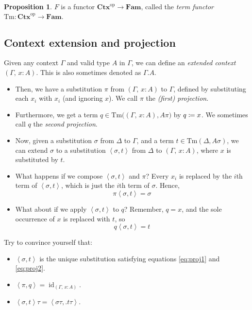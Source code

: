 \documentclass{article}
\theoremstyle{definition}
\newtheorem{proposition}[definition]{Proposition}
\newcommand{\comp}[2]{#2#1}%
\newcommand{\substType}[2]{#2#1}%
\newcommand{\substTerm}[2]{#2#1}%
\newcommand{\extsub}[2]{\ang{#1,#2}}
\newcommand{\C}{\mathbf{Ctx}}
\newcommand{\Fam}{\mathbf{Fam}}
\newcommand{\Tm}{\mathrm{Tm}}
\newcommand{\op}[1]{{#1}^\mathrm{op}}           %
\DeclareMathOperator{\id}{id}				    %
\newcommand{\defeq}{
	\mathrel{\mathrel{\mathop:}\mkern-1.2mu=}}	%
\newcommand{\ang}[1]{\left\langle #1 \right\rangle}
\begin{document}
\begin{proposition}
    $F$ is a functor $\op{\C} \to \Fam$, called the \textit{term functor} $\Tm\colon \op{\C} \to \Fam$.
\end{proposition}


\subsection{Context extension and projection}

Given any context $\Gamma$ and valid type $A$ in $\Gamma$, we can define an \textit{extended context} $(\Gamma,\, x : A)$. This is also sometimes denoted as $\Gamma.A$.

\begin{itemize}
    \item Then, we have a substitution $\pi$ from $(\Gamma,\, x : A)$ to $\Gamma$, defined by substituting each $x_i$ with $x_i$ (and ignoring $x$). We call $\pi$ the \textit{(first) projection}.

    \item Furthermore, we get a term $q \in \Tm \big( (\Gamma,\, x : A), \substType{\pi}{A} \big)$ by $q \defeq x$. We sometimes call $q$ the \textit{second projection}.

    \item Now, given a substitution $\sigma$ from $\Delta$ to $\Gamma$, and a term $t \in \Tm(\Delta, \substType{\sigma}{A})$, we can extend $\sigma$ to a substitution $\extsub{\sigma}{t}$ from $\Delta$ to $(\Gamma,\, x : A)$, where $x$ is substituted by $t$.

    \item What happens if we compose $\extsub{\sigma}{t}$ and $\pi$? Every $x_i$ is replaced by the $i$th term of $\extsub{\sigma}{t}$, which is just the $i$th term of $\sigma$. Hence,
    \begin{equation}\label{eq:proj1}
        \comp{\extsub{\sigma}{t}}{\pi} = \sigma
    \end{equation}

    \item What about if we apply $\extsub{\sigma}{t}$ to $q$? Remember, $q = x$, and the sole occurrence of $x$ is replaced with $t$, so
    \begin{equation}\label{eq:proj2}
        \substTerm{\extsub{\sigma}{t}}{q} = t
    \end{equation}
\end{itemize}
    
\noindent Try to convince yourself that:
\begin{itemize}
    \item $\extsub{\sigma}{t}$ is the unique substitution satisfying equations \eqref{eq:proj1} and \eqref{eq:proj2}.
    
    \item $\extsub{\pi}{q} = \id_{(\Gamma,\, x : A)}$.
    
    \item $\comp{\tau}{\extsub{\sigma}{ t}} = \extsub{ \comp{\tau}{\sigma}}{\big. \substTerm{\tau}{t}}$.
\end{itemize}
\end{document}
